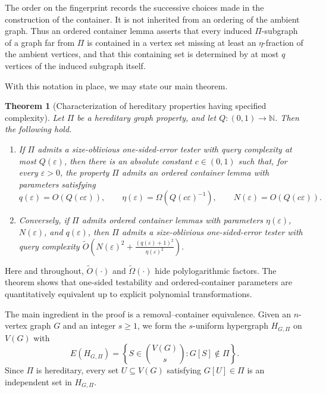 \documentclass[11pt,reqno,letterpaper]{amsart}
\newcommand{\N}{{\mathbb N}}
\theoremstyle{plain}
\newtheorem{thm}{Theorem}[section]
\theoremstyle{remark}
\begin{document}
The order on the fingerprint records the successive choices made in the construction of the container. It is not inherited from an ordering of the ambient graph. Thus an ordered container lemma asserts that every induced $\Pi$-subgraph of a graph far from $\Pi$ is contained in a vertex set missing at least an $\eta$-fraction of the ambient vertices, and that this containing set is determined by at most $q$ vertices of the induced subgraph itself.

With this notation in place, we may state our main theorem.

\begin{thm}[Characterization of hereditary properties having specified complexity]
\label{thm:hereditary-characterization}
Let $\Pi$ be a hereditary graph property, and let $Q:(0,1)\to\N$. Then the following hold.
\begin{enumerate}[label=\textnormal{(\roman*)}]
\item If $\Pi$ admits a size-oblivious one-sided-error tester with query complexity at most $Q(\varepsilon)$, then there is an absolute constant $c\in(0,1)$ such that, for every $\varepsilon>0$, the property $\Pi$ admits an ordered container lemma with parameters satisfying
\[
q(\varepsilon)=O(Q(c\varepsilon)),\qquad
\eta(\varepsilon)=\Omega\!\left(Q(c\varepsilon)^{-1}\right),
\qquad
N(\varepsilon)=O(Q(c\varepsilon)).
\]

\item Conversely, if $\Pi$ admits ordered container lemmas with parameters $\eta(\varepsilon)$, $N(\varepsilon)$, and $q(\varepsilon)$, then $\Pi$ admits a size-oblivious one-sided-error tester with query complexity
\(\widetilde O\!\left( N(\varepsilon)^2+ \frac{(q(\varepsilon)+1)^2}{\eta(\varepsilon)^2} \right).\)

\end{enumerate}
\end{thm}

Here and throughout, $\widetilde O(\cdot)$ and $\widetilde\Omega(\cdot)$ hide polylogarithmic factors. The theorem shows that one-sided testability and ordered-container parameters are quantitatively equivalent up to explicit polynomial transformations.

The main ingredient in the proof is a removal--container equivalence. Given an $n$-vertex graph $G$ and an integer $s\geq1$, we form the $s$-uniform hypergraph $H_{G,\Pi}$ on $V(G)$ with
\[
E(H_{G,\Pi})
=
\left\{
S\in\binom{V(G)}{s}:G[S]\notin\Pi
\right\}.
\]
Since $\Pi$ is hereditary, every set $U\subseteq V(G)$ satisfying $G[U]\in\Pi$ is an independent set in $H_{G,\Pi}$.
\end{document}
